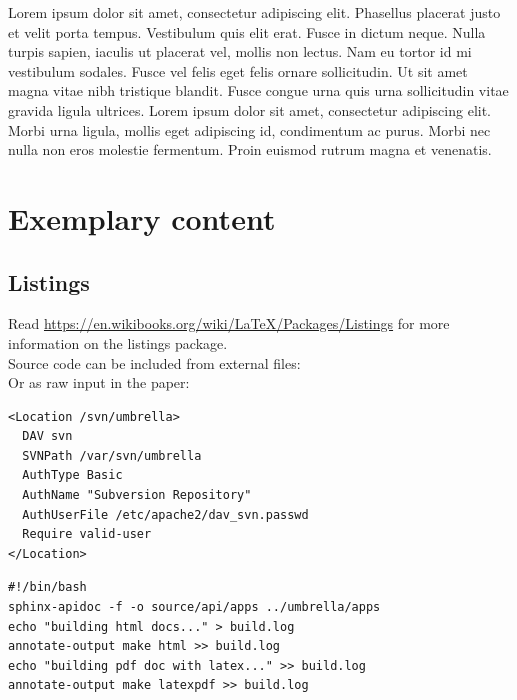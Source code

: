 Lorem ipsum dolor sit amet, consectetur adipiscing elit. Phasellus placerat
justo et velit porta tempus. Vestibulum quis elit erat. Fusce in dictum neque.
Nulla turpis sapien, iaculis ut placerat vel, mollis non lectus. Nam eu tortor
id mi vestibulum sodales. Fusce vel felis eget felis ornare sollicitudin. Ut
sit amet magna vitae nibh tristique blandit. Fusce congue urna quis urna
sollicitudin vitae gravida ligula ultrices. Lorem ipsum dolor sit amet,
consectetur adipiscing elit. Morbi urna ligula, mollis eget adipiscing id,
condimentum ac purus. Morbi nec nulla non eros molestie fermentum. Proin
euismod rutrum magna et venenatis. 


\newpage

\section{Exemplary content}


\subsection{Listings}

Read \url{https://en.wikibooks.org/wiki/LaTeX/Packages/Listings} for more
information on the listings package.\\

Source code can be included from external files:\\



Or as raw input in the paper:\\

\begin{lstlisting}[breaklines=true,
				   frame=single,
				   caption={WebDAV configuration in
					/etc/apache2/mods-available/dav\_svn.conf},
				   label=lst:davsvn]
<Location /svn/umbrella>
  DAV svn
  SVNPath /var/svn/umbrella
  AuthType Basic
  AuthName "Subversion Repository"
  AuthUserFile /etc/apache2/dav_svn.passwd
  Require valid-user
</Location>
\end{lstlisting}


\lstset{tabsize=2,language=bash}
\begin{lstlisting}[breaklines=true,frame=single,caption={Shellscript for building the software documentation in HTML and PDF},label=lst:builddocs]
#!/bin/bash
sphinx-apidoc -f -o source/api/apps ../umbrella/apps
echo "building html docs..." > build.log
annotate-output make html >> build.log
echo "building pdf doc with latex..." >> build.log
annotate-output make latexpdf >> build.log
\end{lstlisting}


